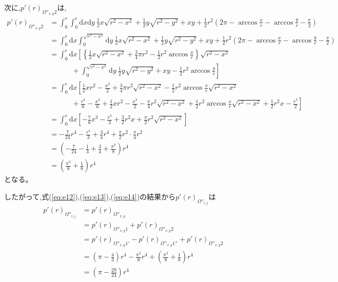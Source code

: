次に,$p'(r)_{\Omega''_{x, y}2}$は,
\begin{align}
p'(r)_{\Omega''_{x, y}2} &= \int^{r}_{0}\int^{r}_{0}\mathrm{d}x\mathrm{d}y\ \frac{1}{2}x\sqrt{r^{2}-x^{2}} + \frac{1}{2}y\sqrt{r^{2} -y^{2}} + xy + \frac{1}{2}r^{2}\left( 2\pi - \arccos\frac{x}{r} - \arccos\frac{y}{r} - \frac{\pi}{2} \right)\nonumber \\
&= \int^{r}_{0}\mathrm{d}x\int^{\sqrt{r^{2}-x^{2}}}_{0}\mathrm{d}y\ \frac{1}{2}x\sqrt{r^{2}-x^{2}} + \frac{1}{2}y\sqrt{r^{2} -y^{2}} + xy + \frac{1}{2}r^{2}\left( 2\pi - \arccos\frac{x}{r} - \arccos\frac{y}{r} - \frac{\pi}{2} \right)\nonumber \\
&= \int^{r}_{0}\mathrm{d}x\left[ \left\{ \frac{1}{2}x\sqrt{r^{2}-x^{2}} + \frac{3}{4}\pi r^{2} - \frac{1}{2}r^{2}\arccos\frac{x}{r} \right\}\sqrt{r^{2}-x^{2}} \right. \nonumber \\
&\ \ \ \ \ \ \ \ \ \ \ \ \ \ + \left.  \int^{\sqrt{r^{2}-x^{2}}}_{0}\mathrm{d}y\ \frac{1}{2}y\sqrt{r^{2}-y^{2}} + xy - \frac{1}{2}r^{2}\arccos\frac{y}{r}\right]\nonumber \\
&= \int^{r}_{0}\mathrm{d}x\left[ \frac{1}{2}xr^{2} - \frac{x^{3}}{2} + \frac{3}{4}\pi r^{2}\sqrt{r^{2}-x^{2}} - \frac{1}{2}r^{2}\arccos \frac{x}{r} \sqrt{r^{2}-x^{2}} \right.\nonumber \\
&\ \ \ \ \ \ \ \ \ \ \ \ \ \ + \left. \frac{r^{3}}{6} - \frac{x^{3}}{6} + \frac{1}{2}xr^{2} - \frac{x^{3}}{2} - \frac{\pi}{4}r^{2}\sqrt{r^{2}-x^{2}} + \frac{1}{2}r^{2}\arccos\frac{x}{r}\sqrt{r^{2}-x^{2}} + \frac{1}{2}r^{2}x - \frac{r^{3}}{2}\right] \nonumber \\
&= \int^{r}_{0}\mathrm{d}x\left[- \frac{7}{6}x^{3} - \frac{r^{3}}{3} + \frac{3}{2}r^{2}x + \frac{\pi}{2}r^{2}\sqrt{r^{2}-x^{2}} \right]\nonumber \\
&= -\frac{7}{24}r^{4} - \frac{r^{4}}{3} + \frac{3}{4}r^{4} + \frac{\pi}{2}r^{2}\cdot \frac{\pi}{4}r^{2}\nonumber \\
&= \left( - \frac{7}{24} - \frac{1}{3} + \frac{3}{4} + \frac{\pi^{2}}{8}\right)r^{4}\nonumber \\
&= \left( \frac{\pi^{2}}{8} + \frac{1}{8} \right)r^{4}\label{eq:e14}
\end{align}
となる。

したがって,式(\ref{eq:e12}),(\ref{eq:e13}),(\ref{eq:e14})の結果から$p'(r)_{\Omega''_{i,j}}$は
\begin{align}
p'(r)_{\Omega''_{i,j}} &= p'(r)_{\Omega''_{x, y}}\nonumber \\
&= p'(r)_{\Omega''_{x, y}1}  +p'(r)_{\Omega''_{x, y}2}\nonumber \\
&= p'(r)_{\Omega''_{x, y}1'} - p'(r)_{\Omega''_{x, y}1''} + p'(r)_{\Omega''_{x, y}2}\nonumber \\
&= \left(\pi -\frac{4}{3}\right)r^{4} - \frac{\pi^{2}}{8}r^{4} + \left( \frac{\pi^{2}}{8} + \frac{1}{8} \right)r^{4}\nonumber \\
&= \left(\pi -\frac{29}{24}\right)r^{4}\label{eq:e15}
\end{align}

